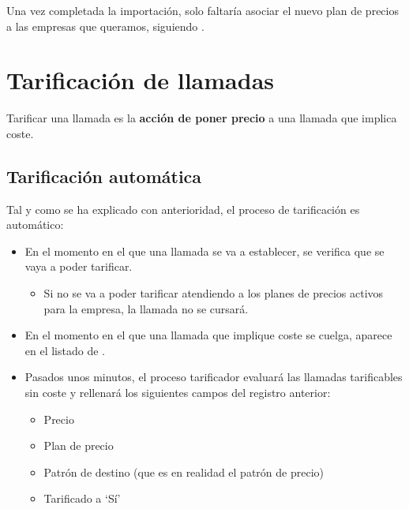 \documentclass[letterpaper,10pt,spanish]{sphinxmanual}
\begin{document}
Una vez completada la importación, solo faltaría asociar el nuevo plan de precios a las empresas que queramos, siguiendo {\hyperref[external_outgoing_calls/noplan_nocall:pricing\string-plan\string-to\string-company]{}}.


\section{Tarificación de llamadas}
\label{billing_and_invoices/bill_a_call::doc}\label{billing_and_invoices/bill_a_call:tarificacion-de-llamadas}
Tarificar una llamada es la \textbf{acción de poner precio} a una llamada que implica coste.


\subsection{Tarificación automática}
\label{billing_and_invoices/bill_a_call:tarificacion-automatica}
Tal y como se ha explicado con anterioridad, el proceso de tarificación es automático:
\begin{itemize}
\item {} 
En el momento en el que una llamada se va a establecer, se verifica que se vaya a poder tarificar.
\begin{itemize}
\item {} 
Si no se va a poder tarificar atendiendo a los planes de precios activos para la empresa, la llamada no se cursará.

\end{itemize}

\item {} 
En el momento en el que una llamada que implique coste se cuelga, aparece en el listado de {\hyperref[billing_and_invoices/billable_calls:billable\string-calls]{}}.

\item {} 
Pasados unos minutos, el proceso tarificador evaluará las llamadas tarificables sin coste y rellenará los siguientes campos del registro anterior:
\begin{itemize}
\item {} 
Precio

\item {} 
Plan de precio

\item {} 
Patrón de destino (que es en realidad el patrón de precio)

\item {} 
Tarificado a `Sí'

\end{itemize}

\end{itemize}
\end{document}
